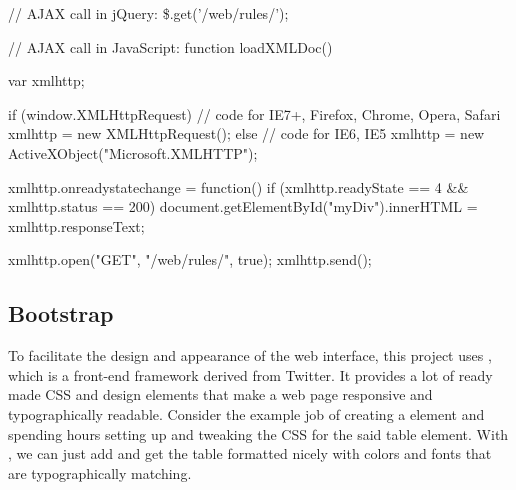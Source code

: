 \begin{javascript}[caption=AJAX call in jQuery and JavaScript.,label=lst:ajax]
// AJAX call in jQuery:
\$.get('/web/rules/');

// AJAX call in JavaScript:
function loadXMLDoc() {
    var xmlhttp;

    if (window.XMLHttpRequest) {
        // code for IE7+, Firefox, Chrome, Opera, Safari
        xmlhttp = new XMLHttpRequest();
    } else {
        // code for IE6, IE5
        xmlhttp = new ActiveXObject("Microsoft.XMLHTTP");
    }

    xmlhttp.onreadystatechange = function() {
        if (xmlhttp.readyState == 4 && xmlhttp.status == 200) {
            document.getElementById("myDiv").innerHTML = xmlhttp.responseText;
        }
    }

    xmlhttp.open("GET", "/web/rules/", true);
    xmlhttp.send();
}

\end{javascript}
\subsection{Bootstrap}
To facilitate the design and appearance of the web interface, this project uses
\bootstrap{} \cite{bootstrap}, which is a front-end framework derived from
Twitter.
It provides a lot of ready made CSS and design elements that make a web page
responsive and typographically readable. Consider the example job of creating a
 element and spending hours setting up and tweaking the CSS
for the said table element. With \bootstrap{}, we can just add  and get the table formatted nicely with colors and fonts that
are typographically matching.
